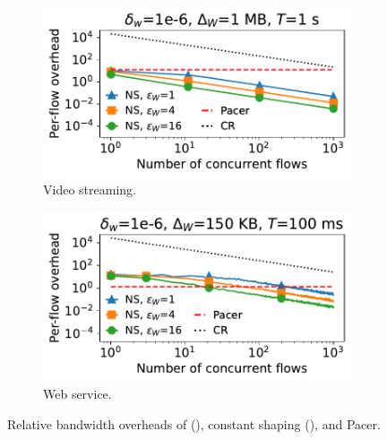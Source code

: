 \begin{figure}[t]
  \centering
  \begin{subfigure}{0.49\columnwidth}
      \centering
      \includegraphics[width=\textwidth]{plots/overhead_vs_number_of_traces_video_loglog.pdf}
      \caption{Video streaming.}
      \label{fig:video-overheads-compare}
  \end{subfigure}
  \hfill
  \begin{subfigure}{0.49\columnwidth}
      \centering
      \includegraphics[width=\textwidth]{plots/overhead_vs_number_of_traces_web_loglog.pdf}
      \caption{Web service.}
      \label{fig:web-overheads-compare}
  \end{subfigure}
  \caption{Relative bandwidth overheads of {\sys} ({\ns}), constant
      shaping ({\constshape}), and Pacer.
  }
\end{figure}



